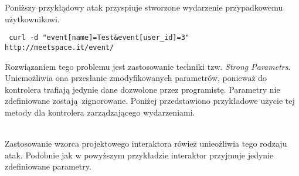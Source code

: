 Poniższy przykłądowy atak przyspiuje stworzone wydarzenie przypadkowemu użytkownikowi.

\texttt{ \footnotesize curl -d "event[name]=Test\&event[user\_id]=3" http://meetspace.it/event/ }

Rozwiązaniem tego problemu jest zastosowanie techniki tzw. \emph{Strong Parametrs}. Uniemożliwia  ona przesłanie zmodyfikowanych parametrów, ponieważ do kontrolera trafiają jedynie dane dozwolone przez programistę. Parametry nie zdefiniowane zostają zignorowane. Poniżej przedstawiono przykładowe użycie tej metody dla kontrolera zarządzającego wydarzeniami.

\begin{code}
  
\end{code}\\
Zastosowanie wzorca projektowego interaktora rówież unieożliwia tego rodzaju atak. Podobnie jak w powyższym przykładzie interaktor przyjmuje jedynie zdefiniowane parametry.

\begin{code}
  
\end{code}\\
